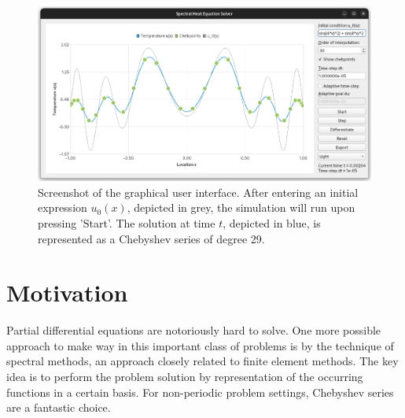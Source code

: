 \documentclass[12pt, a4paper]{article}
\newcommand{\chebyshev}{Chebyshev\xspace}
\begin{document}
  \begin{figure}[H]
    \centering
    \includegraphics[width=\linewidth]{figures/screenshot.png}
    \caption{Screenshot of the graphical user interface. After entering an initial expression $u_0(x)$, depicted in grey, the simulation will run upon pressing 'Start'. The solution at time $t$, depicted in blue, is represented as a \chebyshev series of degree 29.}
  \end{figure}

  \pagebreak
  \pagestyle{normal}


  \section{Motivation}
  Partial differential equations are notoriously hard to solve. One more possible approach to make way in this important class of problems is by the technique of spectral methods, an approach closely related to finite element methods.
  The key idea is to perform the problem solution by representation of the occurring functions in a certain basis.
  For non-periodic problem settings, \chebyshev series are a fantastic choice.
\end{document}
